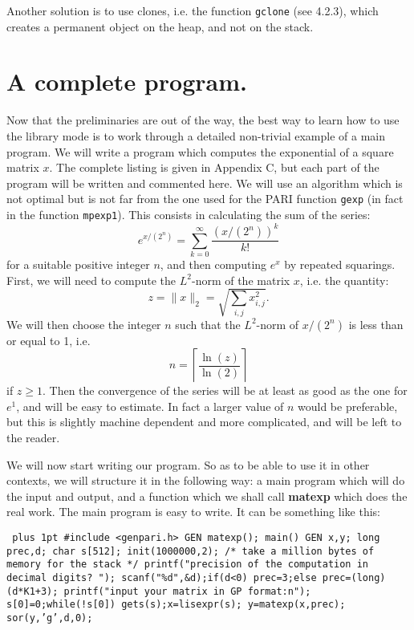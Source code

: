 Another solution is to use clones, i.e. the function {\tt gclone} (see 4.2.3),
which creates a permanent object on the heap, and not on the stack.

\section{A complete program.}

Now that the preliminaries are out of the way, the best way to learn how to use
the library mode is to work through a detailed non-trivial example of a main
program. We will write a program which computes the exponential of a square matrix $x$.
The complete listing is given in Appendix C, but each part of the
program will be written and commented here. We will use an algorithm which is not
optimal but is not far from the one used for the PARI function {\tt gexp} (in fact
in the function {\tt mpexp1}). This consists in calculating the sum of the series:
$$e^{x/(2^n)}=\sum_{k=0}^\infty \dfrac{(x/(2^n))^k}{k!}$$
for a suitable positive integer $n$, and then computing $e^x$ by repeated squarings.
First, we will need to compute the $L^2$-norm of the matrix $x$, i.e. the quantity:
$$z=\|x\|_2=\sqrt{\sum_{i,j}x_{i,j}^2}.$$
We will then choose the integer $n$ such that the $L^2$-norm of $x/(2^n)$ is less than
or equal to 1, i.e. $$n=\left\lceil\dfrac{\ln(z)}{\ln(2)}\right\rceil$$ if $z\ge1$. Then the
convergence of the series will be at least as good as the one for $e^1$,
and will be easy to estimate. In fact a larger value of $n$ would be preferable,
but this is slightly machine dependent and more complicated, and will be left
to the reader.

We will now start writing our program. So as to be able to use it in other
contexts, we will structure it in the following way: a main program which
will do the input and output, and a function which we shall call {\bf matexp}
which does the real work. The main program is easy to write. It can be
something like this:

{\tt \obeylines\parskip=0pt plus 1pt
\hbox{}
\#include <genpari.h>
GEN matexp();
\hbox{}
main()
\obr
\quad GEN x,y;
\quad long prec,d;
\quad char s[512];
\hbox{}
\quad init(1000000,2); /* take a million bytes of memory for the stack */
\quad printf("precision of the computation in decimal digits? ");
\quad scanf("\%d",\&d);if(d<0) prec=3;else prec=(long)(d*K1+3);
\quad printf("input your matrix in GP format:\bs n");
\quad s[0]=0;while(!s[0]) gets(s);x=lisexpr(s);
\quad y=matexp(x,prec);
\quad sor(y,'g',d,0);
\cbr 
}

